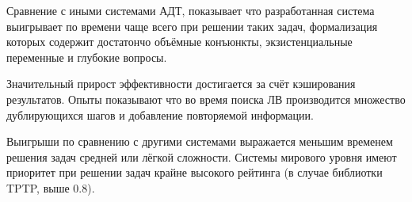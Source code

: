 Сравнение с иными системами АДТ, показывает что разработанная система выигрывает по времени чаще всего при решении таких задач, формализация которых содержит достатончо объёмные конъюнкты, экзистенциальные переменные и глубокие вопросы.

Значительный прирост эффективности достигается за счёт кэширования результатов. Опыты показывают что во время поиска ЛВ производится множество дублирующихся шагов и добавление повторяемой информации.

Выигрыши по сравнению с другими системами выражается меньшим временем решения задач средней или лёгкой сложности. Системы мирового уровня имеют приоритет при решении задач крайне высокого рейтинга (в случае библиотки TPTP, выше 0.8).



